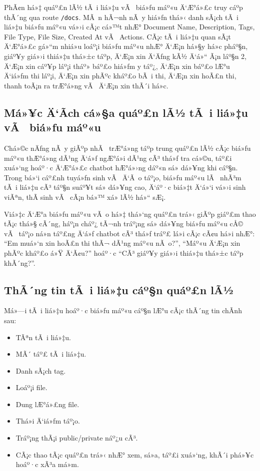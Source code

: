 ﻿\documentclass[12pt,a4paper]{report}
\begin{document}
PhÃ¢n há»‡ quáº£n lÃ½ tÃ i liá»‡u vÃ  biá»ƒu máº«u Ä‘Æ°á»£c truy cáº­p thÃ´ng qua route \texttt{/docs}. MÃ n hÃ¬nh nÃ y hiá»ƒn thá»‹ danh sÃ¡ch tÃ i liá»‡u biá»ƒu máº«u vá»›i cÃ¡c cá»™t nhÆ° Document Name, Description, Tags, File Type, File Size, Created At vÃ  Actions. CÃ¡c tÃ i liá»‡u quan sÃ¡t Ä‘Æ°á»£c gá»“m nhiá»u loáº¡i biá»ƒu máº«u nhÆ° Ä‘Æ¡n há»§y há»c pháº§n, giáº¥y giá»›i thiá»‡u thá»±c táº­p, Ä‘Æ¡n xin Ä‘Äƒng kÃ½ Ä‘á»“ Ã¡n láº§n 2, Ä‘Æ¡n xin cáº¥p láº¡i tháº» báº£o hiá»ƒm y táº¿, Ä‘Æ¡n xin báº£o lÆ°u Ä‘iá»ƒm thi láº¡i, Ä‘Æ¡n xin phÃºc kháº£o bÃ i thi, Ä‘Æ¡n xin hoÃ£n thi, thanh toÃ¡n ra trÆ°á»ng vÃ  Ä‘Æ¡n xin thÃ´i há»c.

\subsection{Má»¥c Ä‘Ã­ch cá»§a quáº£n lÃ½ tÃ i liá»‡u vÃ  biá»ƒu máº«u}

Chá»©c nÄƒng nÃ y giÃºp nhÃ  trÆ°á»ng táº­p trung quáº£n lÃ½ cÃ¡c biá»ƒu máº«u thÆ°á»ng dÃ¹ng Ä‘á»ƒ ngÆ°á»i dÃ¹ng cÃ³ thá»ƒ tra cá»©u, táº£i xuá»‘ng hoáº·c Ä‘Æ°á»£c chatbot hÆ°á»›ng dáº«n sá»­ dá»¥ng khi cáº§n. Trong bá»‘i cáº£nh tuyá»ƒn sinh vÃ  Ä‘Ã o táº¡o, biá»ƒu máº«u lÃ  nhÃ³m tÃ i liá»‡u cÃ³ táº§n suáº¥t sá»­ dá»¥ng cao, Ä‘áº·c biá»‡t Ä‘á»‘i vá»›i sinh viÃªn, thÃ­ sinh vÃ  cÃ¡n bá»™ xá»­ lÃ½ há»“ sÆ¡.

Viá»‡c Ä‘Æ°a biá»ƒu máº«u vÃ o há»‡ thá»‘ng quáº£n trá»‹ giÃºp giáº£m thao tÃ¡c thá»§ cÃ´ng, háº¡n cháº¿ tÃ¬nh tráº¡ng sá»­ dá»¥ng biá»ƒu máº«u cÅ© vÃ  táº¡o ná»n táº£ng Ä‘á»ƒ chatbot cÃ³ thá»ƒ tráº£ lá»i cÃ¡c cÃ¢u há»i nhÆ°: ``Em muá»‘n xin hoÃ£n thi thÃ¬ dÃ¹ng máº«u nÃ o?'', ``Máº«u Ä‘Æ¡n xin phÃºc kháº£o á»Ÿ Ä‘Ã¢u?'' hoáº·c ``CÃ³ giáº¥y giá»›i thiá»‡u thá»±c táº­p khÃ´ng?''.

\subsection{ThÃ´ng tin tÃ i liá»‡u cáº§n quáº£n lÃ½}

Má»—i tÃ i liá»‡u hoáº·c biá»ƒu máº«u cáº§n lÆ°u cÃ¡c thÃ´ng tin chÃ­nh sau:

\begin{itemize}
    \item TÃªn tÃ i liá»‡u.
    \item MÃ´ táº£ tÃ i liá»‡u.
    \item Danh sÃ¡ch tag.
    \item Loáº¡i file.
    \item Dung lÆ°á»£ng file.
    \item Thá»i Ä‘iá»ƒm táº¡o.
    \item Tráº¡ng thÃ¡i public/private náº¿u cÃ³.
    \item CÃ¡c thao tÃ¡c quáº£n trá»‹ nhÆ° xem, sá»­a, táº£i xuá»‘ng, khÃ´i phá»¥c hoáº·c xÃ³a má»m.
\end{itemize}
\end{document}
